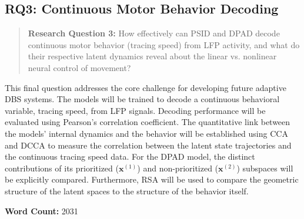 \documentclass[12pt, a4paper]{article}
\begin{document}
\subsection{RQ3: Continuous Motor Behavior Decoding}
\begin{quote}
    \textbf{Research Question 3:} How effectively can PSID and DPAD decode continuous motor behavior (tracing speed) from LFP activity, and what do their respective latent dynamics reveal about the linear vs. nonlinear neural control of movement?
\end{quote}

This final question addresses the core challenge for developing future adaptive DBS systems. The models will be trained to decode a continuous behavioral variable, tracing speed, from LFP signals. Decoding performance will be evaluated using Pearson's correlation coefficient. The quantitative link between the models' internal dynamics and the behavior will be established using CCA and DCCA to measure the correlation between the latent state trajectories and the continuous tracing speed data. For the DPAD model, the distinct contributions of its prioritized ($\mathbf{x}^{(1)}$) and non-prioritized ($\mathbf{x}^{(2)}$) subspaces will be explicitly compared. Furthermore, RSA will be used to compare the geometric structure of the latent spaces to the structure of the behavior itself.


\vspace{1em}
\noindent\textbf{Word Count:} 2031
\newpage
\end{document}
